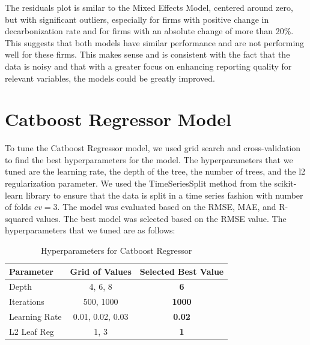 The residuals plot is smilar to the Mixed Effects Model, centered around zero, but with significant outliers, especially for firms with positive change in decarbonization rate and for firms with an absolute change of more than 20\%. This suggests that both models have similar performance and are not performing well for these firms. This makes sense and is consistent with the fact that the data is noisy and that with a greater focus on enhancing reporting quality for relevant variables, the models could be greatly improved.

\section{Catboost Regressor Model}
To tune the Catboost Regressor model, we used grid search and cross-validation to find the best hyperparameters for the model. The hyperparameters that we tuned are the learning rate, the depth of the tree, the number of trees, and the l2 regularization parameter. We used the TimeSeriesSplit method from the scikit-learn library to ensure that the data is split in a time series fashion with number of folds $cv = 3$. The model was evaluated based on the RMSE, MAE, and R-squared values. The best model was selected based on the RMSE value. The hyperparameters that we tuned are as follows:

\begin{table}[H]
    \centering
    \caption{Hyperparameters for Catboost Regressor}
    \label{tab:hyperparameters}
    \begin{tabular}{@{}lcc@{}}
    \toprule
    Parameter       & Grid of Values        & Selected Best Value \\ 
    \midrule
    Depth           & 4, 6, 8               & \textbf{6}                   \\
    Iterations      & 500, 1000             & \textbf{1000}                \\
    Learning Rate   & 0.01, 0.02, 0.03      & \textbf{0.02}                \\
    L2 Leaf Reg     & 1, 3                  & \textbf{1}                   \\ 
    \bottomrule
    \end{tabular}
\end{table}




